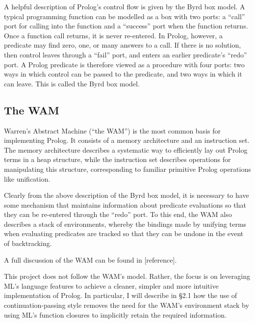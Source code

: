 \documentclass[12pt]{article}
\begin{document}

A helpful description of Prolog's control flow is given by the Byrd box model. 
A typical programming function can be modelled as a box with two ports: a ``call'' port for calling into the function and a ``success'' port when the function returns. 
Once a function call returns, it is never re-entered.
In Prolog, however, a predicate may find zero, one, or many answers to a call. 
If there is no solution, then control leaves through a ``fail'' port, and enters an earlier predicate's ``redo'' port.
A Prolog predicate is therefore viewed as a procedure with four ports: two ways in which control can be passed to the predicate, and two ways in which it can leave.
This is called the Byrd box model.

\subsection{The WAM}


Warren's Abstract Machine (``the WAM'') is the most common basis for implementing Prolog. 
It consists of a memory architecture and an instruction set. 
The memory architecture describes a systematic way to efficiently lay out Prolog terms in a heap structure, while the instruction set describes operations for manipulating this structure, corresponding to familiar primitive Prolog operations like unification. 

Clearly from the above description of the Byrd box model, it is necessary to have some mechanism that maintains information about predicate evaluations so that they can be re-entered through the ``redo'' port. 
To this end, the WAM also describes a stack of environments, whereby the bindings made by unifying terms when evaluating predicates are tracked so that they can be undone in the event of backtracking. 

A full discussion of the WAM can be found in [reference].

This project does not follow the WAM's model. 
Rather, the focus is on leveraging ML's language features to achieve a cleaner, simpler and more intuitive implementation of Prolog. 
In particular, I will describe in \S2.1 how the use of continuation-passing style removes the need for the WAM's environment stack by using ML's function closures to implicitly retain the required information.

\newpage
\end{document}
